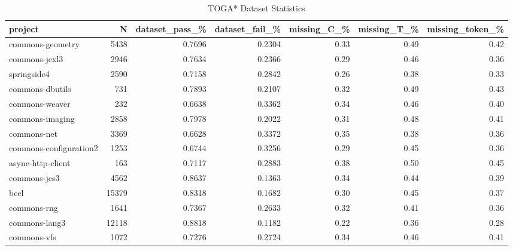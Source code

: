 \begin{table*}
\centering
\caption{TOGA* Dataset Statistics}
\label{tab:toga_stats_all}
\begin{tabular}{lrrrrrr}
\toprule
                project &       N &  dataset\_pass\_\% &  dataset\_fail\_\% &  missing\_C\_\% &  missing\_T\_\% &  missing\_token\_\% \\
\midrule
       commons-geometry &    5438 &          0.7696 &          0.2304 &         0.33 &         0.49 &             0.42 \\
          commons-jexl3 &    2946 &          0.7634 &          0.2366 &         0.29 &         0.46 &             0.36 \\
            springside4 &    2590 &          0.7158 &          0.2842 &         0.26 &         0.38 &             0.33 \\
        commons-dbutils &     731 &          0.7893 &          0.2107 &         0.32 &         0.49 &             0.43 \\
         commons-weaver &     232 &          0.6638 &          0.3362 &         0.34 &         0.46 &             0.40 \\
        commons-imaging &    2858 &          0.7978 &          0.2022 &         0.31 &         0.48 &             0.41 \\
            commons-net &    3369 &          0.6628 &          0.3372 &         0.35 &         0.38 &             0.36 \\
 commons-configuration2 &    1253 &          0.6744 &          0.3256 &         0.29 &         0.45 &             0.36 \\
      async-http-client &     163 &          0.7117 &          0.2883 &         0.38 &         0.50 &             0.45 \\
           commons-jcs3 &    4562 &          0.8637 &          0.1363 &         0.34 &         0.44 &             0.39 \\
                   bcel &   15379 &          0.8318 &          0.1682 &         0.30 &         0.45 &             0.37 \\
            commons-rng &    1641 &          0.7367 &          0.2633 &         0.32 &         0.41 &             0.36 \\
          commons-lang3 &   12118 &          0.8818 &          0.1182 &         0.22 &         0.36 &             0.28 \\
            commons-vfs &    1072 &          0.7276 &          0.2724 &         0.34 &         0.46 &             0.41 \\

\end{tabular}
\end{table*}
